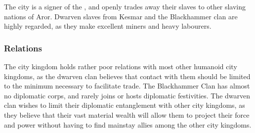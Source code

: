 The city is a signer of the , and openly trades away
their slaves to other slaving nations of Aror. Dwarven slaves from Kesmar and
the Blackhammer clan are highly regarded, as they make excellent miners and
heavy labourers.

\subsubsection{Relations}

The city kingdom holds rather poor relations with most other humanoid city
kingdoms, as the dwarven clan believes that contact with them should be limited
to the minimum necessary to facilitate trade. The Blackhammer Clan has almost no
diplomatic corps, and rarely joins or hosts diplomatic festivities. The
dwarven clan wishes to limit their diplomatic entanglement with other city
kingdoms, as they believe that their vast material wealth will allow them to
project their force and power without having to find mainstay allies among the
other city kingdoms.
